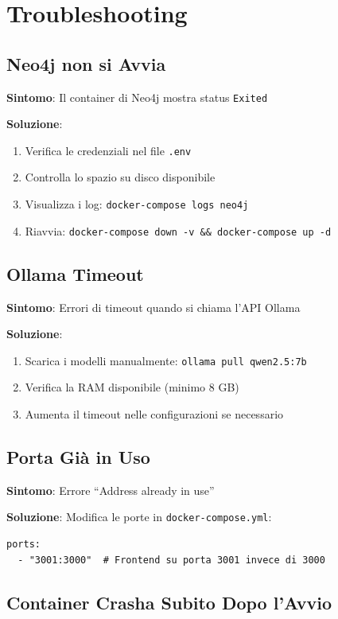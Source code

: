 \section{Troubleshooting}

\subsection{Neo4j non si Avvia}

\textbf{Sintomo}: Il container di Neo4j mostra status \texttt{Exited}

\textbf{Soluzione}:
\begin{enumerate}
    \item Verifica le credenziali nel file \texttt{.env}
    \item Controlla lo spazio su disco disponibile
    \item Visualizza i log: \texttt{docker-compose logs neo4j}
    \item Riavvia: \texttt{docker-compose down -v \&\& docker-compose up -d}
\end{enumerate}

\subsection{Ollama Timeout}

\textbf{Sintomo}: Errori di timeout quando si chiama l'API Ollama

\textbf{Soluzione}:
\begin{enumerate}
    \item Scarica i modelli manualmente: \texttt{ollama pull qwen2.5:7b}
    \item Verifica la RAM disponibile (minimo 8 GB)
    \item Aumenta il timeout nelle configurazioni se necessario
\end{enumerate}

\subsection{Porta Già in Uso}

\textbf{Sintomo}: Errore ``Address already in use''

\textbf{Soluzione}: Modifica le porte in \texttt{docker-compose.yml}:
\begin{lstlisting}
ports:
  - "3001:3000"  # Frontend su porta 3001 invece di 3000
\end{lstlisting}

\subsection{Container Crasha Subito Dopo l'Avvio}

